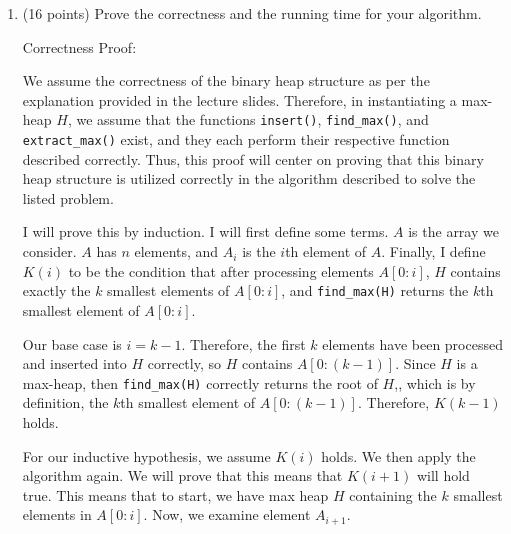 \documentclass[11pt]{article}
\begin{document}
\begin{enumerate}
Generalizing this process, at every point after processing a prefix within $A$ of length at least $k$, 
$H$ contains exactly the $k$ smallest elements of the prefix. Since $H$ is a max heap, its root is the $k$th smallest element of the prefix, 
so it can be extracted to find the $k$th smallest element of any prefix. This repeats for each element of $A$ with a position greater than $k$. 
Thus, for each of the $n$ elements of $A$, an $O(\log k)$ operation (either insertion for the first $k$ elements or 
extraction and insertion for subsequent elements) could occur. Therefore, the overall time complexity needed to form 
an array of the $k$th smallest element of $A$ for every subarray of $A$ which is at least length $k$ is $O(n \log k)$.

\item (16 points) Prove the correctness and the running time for your algorithm.

Correctness Proof:

We assume the correctness of the binary heap structure as per the explanation provided in the lecture slides. 
Therefore, in instantiating a max-heap $H$, we assume that the functions \verb|insert()|, \verb|find_max()|, and \verb|extract_max()| exist, 
and they each perform their respective function described correctly. 
Thus, this proof will center on proving that this binary heap structure is utilized correctly in the algorithm described to solve the listed problem.

I will prove this by induction. I will first define some terms. $A$ is the array we consider. $A$ has $n$ elements, and $A_i$ is the $i$th element of $A$. 
Finally, I define $K(i)$ to be the condition that after processing elements $A[0:i]$, $H$ contains exactly the $k$ smallest elements of $A[0:i]$, 
and \verb|find_max(H)| returns the $k$th smallest element of $A[0:i]$.

Our base case is $i = k-1$. Therefore, the first $k$ elements have been processed and inserted into $H$ correctly, 
so $H$ contains $A[0:(k-1)]$. Since $H$ is a max-heap, then \verb|find_max(H)| correctly returns the root of $H$,, which is by definition, 
the $k$th smallest element of $A[0:(k-1)]$. Therefore, $K(k-1)$ holds.

For our inductive hypothesis, we assume $K(i)$ holds. We then apply the algorithm again. We will prove that this means that $K(i+1)$ will hold true. 
This means that to start, we have max heap $H$ containing the $k$ smallest elements in $A[0:i]$. Now, we examine element $A_{i+1}$. 


\end{enumerate}
\end{document}
